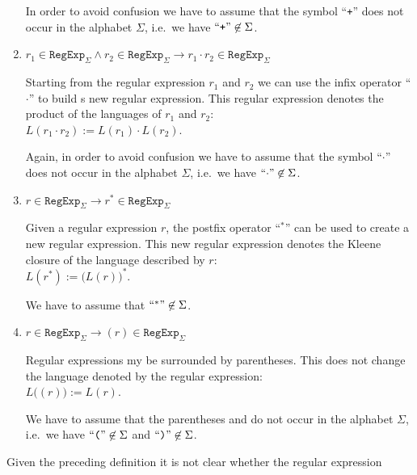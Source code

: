 \begin{Definition}
\begin{enumerate}
        In order to avoid confusion we have to assume that the symbol  ``\texttt{+}'' does not occur
        in the alphabet $\Sigma$, i.e.~we have  $\mbox{``\texttt{+}''} \not\in \Sigma$.
  \item $r_1 \in \texttt{RegExp}_\Sigma \wedge r_2 \in \texttt{RegExp}_\Sigma 
         \rightarrow r_1 \cdot r_2 \in \texttt{RegExp}_\Sigma$

        Starting from the regular expression $r_1$ and $r_2$ we can use the  infix operator
        ``$\cdot$'' to build s new regular expression.  This regular expression denotes
        the product of the languages of $r_1$ and $r_2$:
        \\[0.2cm]
        \hspace*{1.3cm}
        $L(r_1 \cdot r_2) := L(r_1) \cdot L(r_2)$.

        Again, in order to avoid confusion we have to assume that the symbol ``$\cdot$'' does not
        occur in the alphabet $\Sigma$, i.e.~we have $\mbox{``\texttt{$\cdot$}''} \not\in \Sigma$.
  \item $r \in \texttt{RegExp}_\Sigma \rightarrow r^* \in \texttt{RegExp}_\Sigma$

        Given a regular expression $r$, the postfix operator
        ``$^*$'' can be used to create a new regular expression.  This new regular expression
        denotes the Kleene closure of the language described by  $r$:
        \\[0.2cm]
        \hspace*{1.3cm}
        $L(r^*) := \bigl(L(r)\bigr)^*$.

        We have to assume that $\mbox{``\texttt{$^*$}''} \not\in \Sigma$. 
  \item $r \in \texttt{RegExp}_\Sigma \rightarrow (r) \in \texttt{RegExp}_\Sigma$

        Regular expressions my be surrounded by parentheses.  This does not change the language
        denoted by the regular expression:
        \\[0.2cm]
        \hspace*{1.3cm}
        $L\bigl((r)\bigr) := L(r)$. 

        We have to assume that the parentheses  \qote{(} and \qote{)} do not occur
        in the alphabet $\Sigma$, i.e.~we have $\mbox{``\texttt{(}''} \not\in \Sigma$  and $\mbox{``\texttt{)}''} \not\in \Sigma$. \eox
  \end{enumerate}
\end{Definition}
Given the preceding definition it is not clear whether the regular expression
\\[0.2cm]
